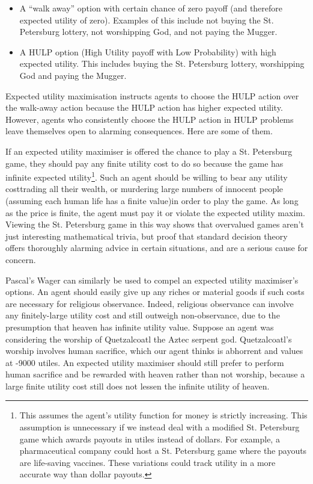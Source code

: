 \documentclass{article}
\begin{document}
\begin{itemize}
\item A “walk away” option with certain chance of zero payoff (and therefore expected utility of zero). Examples of this include not buying the St. Petersburg lottery, not worshipping God, and not paying the Mugger.
\item A HULP option (High Utility payoff with Low Probability) with high expected utility. This includes buying the St. Petersburg lottery, worshipping God and paying the Mugger.
\end{itemize}

Expected utility maximisation instructs agents to choose the HULP action over the walk-away action because the HULP action has higher expected utility. However, agents who consistently choose the HULP action in HULP problems leave themselves open to alarming consequences. Here are some of them.

If an expected utility maximiser is offered the chance to play a St. Petersburg game, they should pay any finite utility cost to do so because the game has infinite expected utility\footnote{This assumes the agent's utility function for money is strictly increasing. This assumption is unnecessary if we instead deal with a modified St. Petersburg game which awards payouts in utiles instead of dollars. For example, a pharmaceutical company could host a St. Petersburg game where the payouts are life-saving vaccines. These variations could track utility in a more accurate way than dollar payouts.}. Such an agent should be willing to bear any utility cost\textemdash trading all their wealth, or murdering large numbers of innocent people (assuming each human life has a finite value)\textemdash in order to play the game. As long as the price is finite, the agent must pay it or violate the expected utility maxim. Viewing the St. Petersburg game in this way shows that overvalued games aren't just interesting mathematical trivia, but proof that standard decision theory offers thoroughly alarming advice in certain situations, and are a serious cause for concern.

Pascal's Wager can similarly be used to compel an expected utility maximiser's options. An agent should easily give up any riches or material goods if such costs are necessary for religious observance. Indeed, religious observance can involve any finitely-large utility cost and still outweigh non-observance, due to the presumption that heaven has infinite utility value. Suppose an agent was considering the worship of Quetzalcoatl the Aztec serpent god. Quetzalcoatl's worship involves human sacrifice, which our agent thinks is abhorrent and values at -9000 utiles. An expected utility maximiser should still prefer to perform human sacrifice and be rewarded with heaven rather than not worship, because a large finite utility cost still does not lessen the infinite utility of heaven. 
\end{document}
